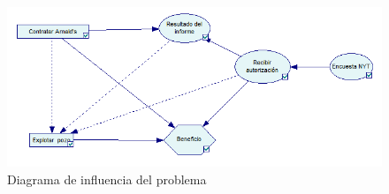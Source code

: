 \documentclass[12pt,a4paper,openright,final]{article}
\begin{document}
\begin{figure}[tbph!]
	\centering
	\includegraphics[width=\linewidth]{imagenes/diagrama_influencia.png}
	\caption{Diagrama de influencia del problema}
	\label{fig:diagrama_influencia}
\end{figure}
\end{document}
